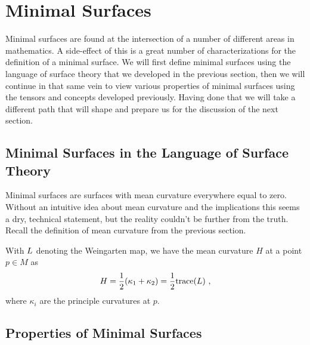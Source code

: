 \section{Minimal Surfaces}

Minimal surfaces are found at the intersection of a number of different areas in mathematics. A side-effect of this is a great number of characterizations for the definition of a minimal surface. We will first define minimal surfaces using the language of surface theory that we developed in the previous section, then we will continue in that same vein to view various properties of minimal surfaces using the tensors and concepts developed previously. Having done that we will take a different path that will shape and prepare us for the discussion of the next section.

\subsection{Minimal Surfaces in the Language of Surface Theory}

Minimal surfaces are surfaces with mean curvature everywhere equal to zero. Without an intuitive idea about mean curvature and the implications this seems a dry, technical statement, but the reality couldn't be further from the truth. Recall the definition of mean curvature from the previous section.

With $L$ denoting the Weingarten map, we have the mean curvature $H$ at a point $p \in M$ as
\[
  H = \frac{1}{2} (\kappa_1 + \kappa_2) =  \frac{1}{2}\text{trace}(L) \ ,
\]
where $\kappa_i$ are the principle curvatures at $p$.





\subsection{Properties of Minimal Surfaces}




